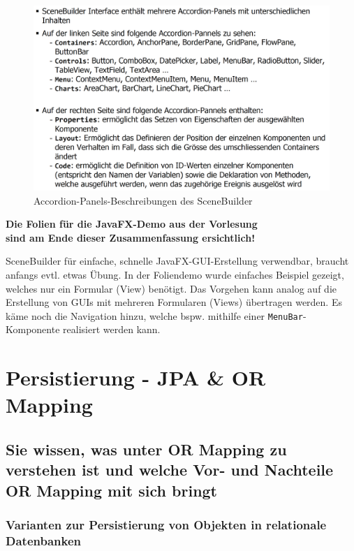 \documentclass[a4paper]{article}
\begin{document}
		\begin{figure}[!htb]
			\centering
			\includegraphics[keepaspectratio, width=\textwidth]{img/gui/scenebuilder_comp.png}
			\caption{Accordion-Panels-Beschreibungen des SceneBuilder}
			\label{fig:scene02}
		\end{figure}
		\noindent
		\begin{center}
			\textbf{Die Folien für die JavaFX-Demo aus der Vorlesung \\
			sind am Ende dieser Zusammenfassung ersichtlich!}
		\end{center}
		\noindent
		SceneBuilder für einfache, schnelle JavaFX-GUI-Erstellung verwendbar, braucht anfangs evtl. etwas Übung.
		In der Foliendemo wurde einfaches Beispiel gezeigt, welches nur ein Formular (View) benötigt.
		Das Vorgehen kann analog auf die Erstellung von GUIs mit mehreren Formularen (Views) übertragen werden.
		Es käme noch die Navigation hinzu, welche bspw. mithilfe einer \texttt{MenuBar}-Komponente realisiert werden kann.
		
	\newpage
	\section{Persistierung - JPA \& OR Mapping}
	
		\subsection{Sie wissen, was unter OR Mapping zu verstehen ist und welche Vor- und Nachteile OR Mapping mit sich bringt}
		
			\subsubsection{Varianten zur Persistierung von Objekten in relationale Datenbanken}
			
\end{document}
